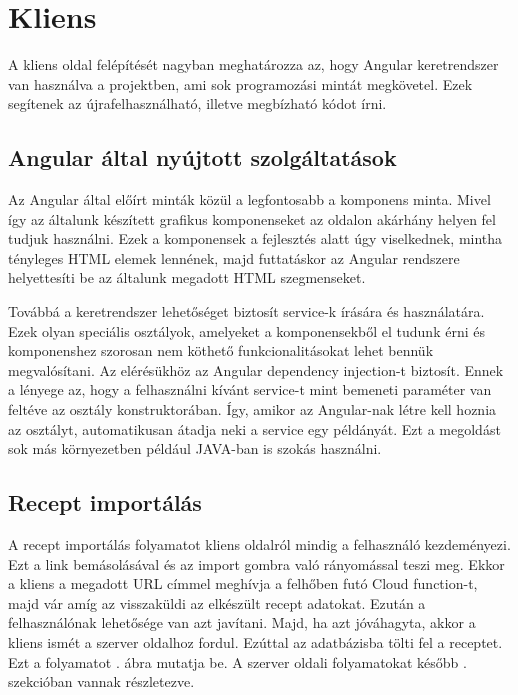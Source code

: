 \documentclass[12pt]{report}
\theoremstyle{definition}
\begin{document}
\section{Kliens}
A kliens oldal felépítését nagyban meghatározza az, hogy Angular keretrendszer van használva a projektben, ami sok programozási mintát megkövetel. Ezek segítenek az újrafelhasználható, illetve megbízható kódot írni.



\subsection{Angular által nyújtott szolgáltatások}
Az Angular által előírt minták közül a legfontosabb a komponens minta. Mivel így az általunk készített grafikus komponenseket az oldalon akárhány helyen fel tudjuk használni. Ezek a komponensek a fejlesztés alatt úgy viselkednek, mintha tényleges HTML elemek lennének, majd futtatáskor az Angular rendszere helyettesíti be az általunk megadott HTML szegmenseket.

Továbbá a keretrendszer lehetőséget biztosít service-k írására és használatára. Ezek olyan speciális osztályok, amelyeket a komponensekből el tudunk érni és komponenshez szorosan nem köthető funkcionalitásokat lehet bennük megvalósítani. Az elérésükhöz az Angular dependency injection-t biztosít. Ennek a lényege az, hogy a felhasználni kívánt service-t mint bemeneti paraméter van feltéve az osztály konstruktorában. Így, amikor az Angular-nak létre kell hoznia az osztályt, automatikusan átadja neki a service egy példányát.  Ezt a megoldást sok más környezetben például JAVA-ban is szokás használni.

\subsection{Recept importálás}
A recept importálás folyamatot kliens oldalról mindig a felhasználó kezdeményezi.
Ezt a link bemásolásával és az import gombra való rányomással teszi meg. 
Ekkor a kliens a megadott URL címmel meghívja a felhőben futó Cloud function-t, majd vár amíg az visszaküldi az elkészült recept adatokat. 
Ezután a felhasználónak lehetősége van azt javítani. Majd, ha azt jóváhagyta, akkor a kliens ismét a szerver oldalhoz fordul. 
Ezúttal az adatbázisba tölti fel a receptet. Ezt a folyamatot \az{\ref{fig:clientRecipeImport}}. ábra mutatja be.
A szerver oldali folyamatokat később \az{\ref{serverImportsRecipe}}. szekcióban vannak részletezve.
\end{document}
